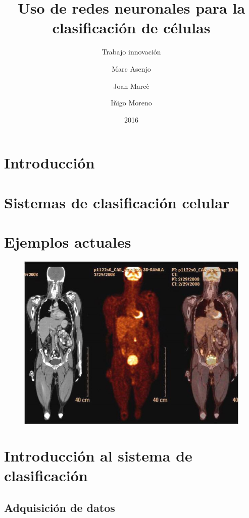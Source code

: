 \documentclass{beamer}
\title[Uso redes neuronales]{Uso de redes neuronales para la clasificación de células}
\subtitle{Trabajo innovación}
\author[Marc, Joan, Iñigo]{
	Marc Asenjo \and
	Joan Marcè \and
	Iñigo Moreno
	}
\institute[UPC]{Universitat Politècnica de Catalunya}
\date{2016}
\begin{document}
\frame{\titlepage}

\section{Introducción}

\section{Sistemas de clasificación celular}

\section{Ejemplos actuales}

\begin{frame}
	\begin{figure}
		\centering
		\includegraphics[width=.9\textheight]{intro_1}
	\end{figure}
\end{frame}

\section{Introducción al sistema de clasificación}

\subsection{Adquisición de datos}
\end{document}
